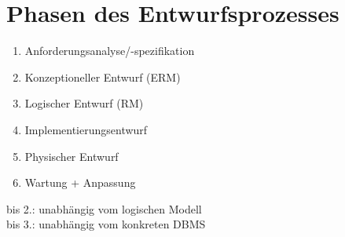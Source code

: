 \section{Phasen des Entwurfsprozesses}
\begin{enumerate}
\item Anforderungsanalyse/-spezifikation
\item Konzeptioneller Entwurf (ERM)
\item Logischer Entwurf (RM)
\item Implementierungsentwurf
\item Physischer Entwurf
\item Wartung + Anpassung
\end{enumerate}
bis 2.: unabhängig vom logischen Modell\\
bis 3.: unabhängig vom konkreten DBMS



